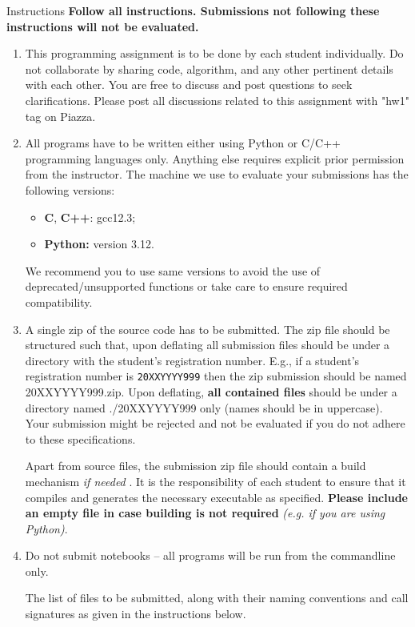 \documentclass[10pt]{article}
\begin{document}
\begin{exbox}{Instructions}
\textbf{\large Follow all instructions. Submissions not following these instructions will not be evaluated.}
{\small
\begin{enumerate}
\item This programming assignment is to be done by each student individually. Do not collaborate by sharing code, algorithm, and any other pertinent details with each other. You are free to discuss and post questions to seek clarifications. Please post all discussions related to this assignment with "hw1" tag on Piazza. 
\item All programs have to be written either using Python or C/C++ programming languages only. Anything else requires explicit prior permission from the instructor. The machine we use to evaluate your submissions has the following versions: \begin{itemize} \item {\textbf{C}, \textbf{C++}: gcc12.3;} \item {\textbf{Python: } version 3.12.} 
\end{itemize} 
We recommend you to use same versions to avoid the use of deprecated/unsupported functions or take care to ensure required compatibility. 
\item A single zip of the source code has to be submitted. The zip file should be structured such that, upon deflating all submission files should be under a directory with the student's registration number. E.g., if a student's registration number is \texttt{20XXYYYY999} then the zip submission should be named \textsf{20XXYYYY999.zip}. Upon deflating, \textbf{all contained files} should be under a directory named \textsf{./20XXYYYY999} only (names should be in uppercase). Your submission might be rejected and not be evaluated if you do not adhere to these specifications.
		
	Apart from source files, the submission zip file should contain a build mechanism \textit{if needed} . It is the responsibility of each student to ensure that it compiles and generates the necessary executable as specified. \textbf{Please include an empty file in case building is not required} \textit{(e.g. if you are using Python)}. 	    \item Do not submit notebooks -- all programs will be run from the commandline only.
	
	The  list of files to be submitted, along with their naming conventions and call signatures as given in the instructions below.


\end{enumerate}}
\end{exbox}
\end{document}
